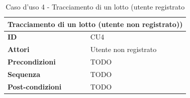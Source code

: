 \documentclass[a4paper,11pt]{article}
\begin{document}
\begin{table}[H]
  \centering
  \begin{tabular}{|m{2cm}|m{10.5cm}|}
    \hline
    \multicolumn{2}{|c|}{\textbf{Tracciamento di un lotto (utente non registrato))}} \\ \hline
    \multicolumn{1}{|l|}{\textbf{ID}}              & CU4                             \\ \hline
    \multicolumn{1}{|l|}{\textbf{Attori}}          & Utente non registrato           \\ \hline
    \multicolumn{1}{|l|}{\textbf{Precondizioni}}   & TODO                            \\ \hline
    \multicolumn{1}{|l|}{\textbf{Sequenza}}        & TODO                            \\ \hline
    \multicolumn{1}{|l|}{\textbf{Post-condizioni}} & TODO                            \\ \hline
  \end{tabular}
  \caption{Caso d'uso 4 - Tracciamento di un lotto (utente registrato}
  \label{cu:CU4}
\end{table}
\end{document}
